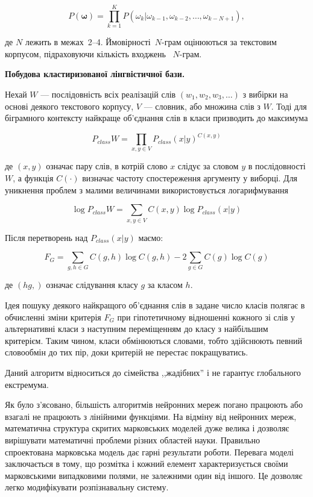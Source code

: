\documentclass{diploma}
\begin{document}
\begin{equation}
\label{eq:8}
P(\boldsymbol\omega) = \prod_{k=1}^K P(\omega_k|\omega_{k-1},\omega_{k-2},\dots,\omega_{k-N+1}),
\end{equation}

де $N$ лежить в межах~2--4. Ймовірності~$N$-грам оцінюються за текстовим корпусом, підраховуючи кількість входжень ~$N$-грам.~\cite{l1}


\textbf{Побудова кластиризованої лінгвістичної бази.} 


Нехай $W$ --- послідовність всіх реалізацій слів $(w_1, w_2, w_3,\dots)$ з вибірки на основі деякого текстового корпусу, $V$ --- словник, або множина слів з $W$. Тоді для біграмного контексту найкраще об'єднання слів в класи призводить до максимума

\begin{equation}
\label{a}
P_{class}W = \prod_{x,y \in V}  P_{class}(x|y)^{C(x,y)}
\end{equation}


де $(x,y)$ означає пару слів, в котрій слово $x$ слідує за словом $y$ в послідовності $W$, а функція $C(\cdot)$ визначає частоту спостереження аргументу у виборці. Для уникнення проблем з малими величинами використовується логарифмування

\begin{equation}
\label{b}
\log P_{class}W = \sum_{x,y \in V}C(x,y) \log P_{class}(x|y)
\end{equation}

Після перетворень над $P_{class}(x|y)$ маємо:

\begin{equation}
\label{c}
F_G =\sum_{g,h \in G}C(g,h) \log C(g,h)- 2\sum_{g \in G}C(g) \log C(g)
\end{equation}

де $(hg,)$ означає слідування класу $g$ за класом $h$.

Ідея пошуку деякого найкращого об'єднання слів в задане число класів полягає в обчисленні зміни критерія $F_G$ при гіпотетичному відношенні кожного зі слів у альтернативні класи з наступним переміщенням до класу з найбільшим критерієм. Таким чином, класи обмінюються словами, тобто здійснюють певний словообмін до тих пір, доки критерій не перестає покращуватись. 

Даний алгоритм відноситься до сімейства ,,жадібних'' і не гарантує глобального екстремума.~\cite{l3}



Як було з'ясовано, більшість алгоритмів нейронних мереж погано працюють або взагалі не працюють з лінійними функціями. На відміну від нейронних мереж, математична структура скритих марковських моделей дуже велика і дозволяє вирішувати математичні проблеми різних областей науки. Правильно спроектована марковська модель дає гарні результати роботи. Перевага моделі заключається в тому, що розмітка і кожний елемент характеризується своїми марковськими випадковими полями, не залежними один від іншого. Це дозволяє легко модифікувати розпізнавальну систему.
\end{document}
